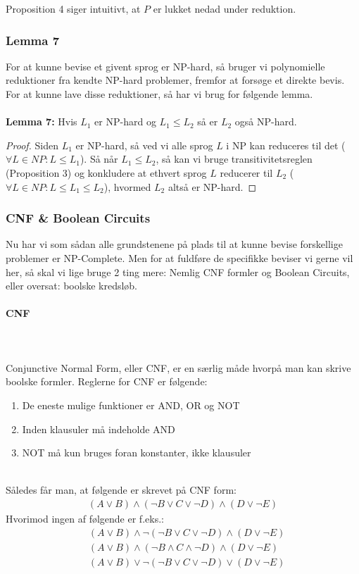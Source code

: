Proposition 4 siger intuitivt, at $P$ er lukket nedad under reduktion. 

\subsubsection{Lemma 7}

For at kunne bevise et givent sprog er NP-hard, så bruger vi polynomielle reduktioner fra kendte NP-hard problemer, fremfor at forsøge et direkte bevis. For at kunne lave disse reduktioner, så har vi brug for følgende lemma.\\
~\\
\textbf{Lemma 7:} Hvis $L_1$ er NP-hard og $L_1 \leq L_2$ så er $L_2$ også NP-hard.

\begin{proof}
 Siden $L_1$ er NP-hard, så ved vi alle sprog $L$ i NP kan reduceres til det ($\forall L \in NP: L \leq L_1$). Så når $L_1 \leq L_2$, så kan vi bruge transitivitetsreglen (Proposition 3) og konkludere at ethvert sprog $L$ reducerer til $L_2$ ($\forall L \in NP: L \leq L_1 \leq L_2$), hvormed $L_2$ altså er NP-hard.
\end{proof}

\subsubsection{CNF \& Boolean Circuits}

Nu har vi som sådan alle grundstenene på plads til at kunne bevise forskellige problemer er NP-Complete. Men for at fuldføre de specifikke beviser vi gerne vil her, så skal vi lige bruge 2 ting mere: Nemlig CNF formler og Boolean Circuits, eller oversat: boolske kredsløb.\\

\paragraph{CNF}
~\\
~\\
Conjunctive Normal Form, eller CNF, er en særlig måde hvorpå man kan skrive boolske formler. Reglerne for CNF er følgende:
\begin{enumerate}
 \item De eneste mulige funktioner er AND, OR og NOT
 \item Inden klausuler må indeholde AND
 \item NOT må kun bruges foran konstanter, ikke klausuler
\end{enumerate}
~\\
Således får man, at følgende er skrevet på CNF form:
\begin{align*}
 (A \vee B) \wedge (\neg B \vee C \vee \neg D) \wedge (D \vee \neg E)
\end{align*}
Hvorimod ingen af følgende er f.eks.:
\begin{align*}
 &(A \vee B) \wedge \neg(\neg B \vee C \vee \neg D) \wedge (D \vee \neg E) \\
 &(A \vee B) \wedge (\neg B \wedge C \wedge \neg D) \wedge (D \vee \neg E) \\
 &(A \vee B) \vee \neg(\neg B \vee C \vee \neg D) \vee (D \vee \neg E)
\end{align*}

